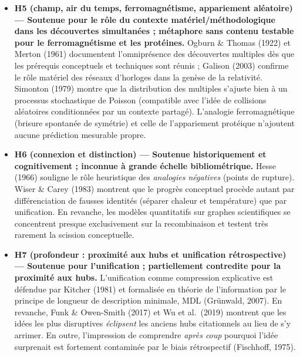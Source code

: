 \documentclass[a4paper,11pt]{article}
\begin{document}
\begin{itemize}
  établie (Berlyne, 1970 ; Loewenstein, 1994), tout comme l'équilibre
  entre familier et surprenant (Davis, 1971 ; Uzzi et al., 2013).
  Toutefois, pour la fécondité scientifique, des sauts locaux restent
  productifs (Kaplan \& Vakili, 2015) : le « trop près » est moins
  pénalisé en vérité qu'en intérêt perçu.
\item
  \textbf{H5 (champ, air du temps, ferromagnétisme, appariement
  aléatoire) --- Soutenue pour le rôle du contexte
  matériel/méthodologique dans les découvertes simultanées ; métaphore
  sans contenu testable pour le ferromagnétisme et les protéines.}
  Ogburn \& Thomas (1922) et Merton (1961) documentent l'omniprésence
  des découvertes multiples dès que les prérequis conceptuels et
  techniques sont réunis ; Galison (2003) confirme le rôle matériel des
  réseaux d'horloges dans la genèse de la relativité. Simonton (1979)
  montre que la distribution des multiples s'ajuste bien à un processus
  stochastique de Poisson (compatible avec l'idée de collisions
  aléatoires conditionnées par un contexte partagé). L'analogie
  ferromagnétique (brisure spontanée de symétrie) et celle de
  l'appariement protéique n'ajoutent aucune prédiction mesurable propre.
\item
  \textbf{H6 (connexion et distinction) --- Soutenue historiquement et
  cognitivement ; inconnue à grande échelle bibliométrique.} Hesse
  (1966) souligne le rôle heuristique des \emph{analogies négatives}
  (points de rupture). Wiser \& Carey (1983) montrent que le progrès
  conceptuel procède autant par différenciation de fausses identités
  (séparer chaleur et température) que par unification. En revanche, les
  modèles quantitatifs sur graphes scientifiques se concentrent presque
  exclusivement sur la recombinaison et testent très rarement la
  scission conceptuelle.
\item
  \textbf{H7 (profondeur : proximité aux hubs et unification
  rétrospective) --- Soutenue pour l'unification ; partiellement
  contredite pour la proximité aux hubs.} L'unification comme
  compression explicative est défendue par Kitcher (1981) et formalisée
  en théorie de l'information par le principe de longueur de description
  minimale, MDL (Grünwald, 2007). En revanche, Funk \& Owen-Smith (2017)
  et Wu et al.~(2019) montrent que les idées les plus disruptives
  \emph{éclipsent} les anciens hubs citationnels au lieu de s'y arrimer.
  En outre, l'impression de comprendre \emph{après coup} pourquoi l'idée
  surprenait est fortement contaminée par le biais rétrospectif
  (Fischhoff, 1975).

\end{itemize}
\end{document}
